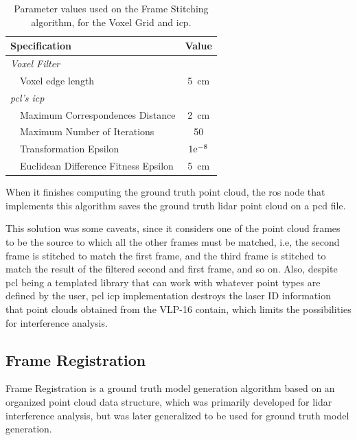 \begin{table}[H]
\centering
\renewcommand{\arraystretch}{1.2}
\begin{tabular}{@{}lp{8cm}c@{}}
	\toprule
	\multicolumn{2}{l}{Specification} & Value \\
		\midrule
	\multicolumn{2}{l}{\textit{Voxel Filter}} & \\ 
	\phantom{ab} & Voxel edge length & \SI{5}{\centi\meter} \\ 
	\midrule
	\multicolumn{2}{l}{\textit{\ac{pcl}'s \ac{icp}}} &  \\ 
	\phantom{ab} & Maximum Correspondences Distance & \SI{2}{\centi\meter} \\
							 & Maximum Number of Iterations & 50 \\
							 & Transformation Epsilon & $1\mathrm{e}^{-8}$ \\
							 & Euclidean Difference Fitness Epsilon & \SI{5}{\centi\meter} \\
	\bottomrule
\end{tabular}
\caption{Parameter values used on the Frame Stitching algorithm, for the Voxel Grid and \ac{icp}.}
\label{tab:frame-stitching-parameters}
\end{table}

When it finishes computing the ground truth point cloud, the \ac{ros} node that implements this algorithm saves the ground truth \ac{lidar} point cloud on a \ac{pcd} file.

This solution was some caveats, since it considers one of the point cloud frames to be the source to which all the other frames must be matched, i.e, the second frame is stitched to match the first frame, and the third frame is stitched to match the result of the filtered second and first frame, and so on. Also, despite \ac{pcl} being a templated library that can work with whatever point types are defined by the user, \ac{pcl} \ac{icp} implementation destroys the laser ID information that point clouds obtained from the VLP-16 contain, which limits the possibilities for interference analysis. 


\subsection{Frame Registration}
\label{subsec:lidar-interference:frame-registration}
Frame Registration is a ground truth model generation algorithm based on an organized point cloud data structure, which was primarily developed for \ac{lidar} interference analysis, but was later generalized to be used for ground truth model generation.

